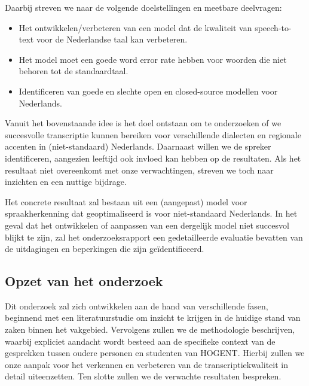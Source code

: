 Daarbij streven we naar de volgende doelstellingen en meetbare deelvragen:
\begin{itemize}
    \item Het ontwikkelen/verbeteren van een model dat de kwaliteit van speech-to-text voor de Nederlandse taal kan verbeteren.
    \item Het model moet een goede word error rate hebben voor woorden die niet behoren tot de standaardtaal.
    \item Identificeren van goede en slechte open en closed-source modellen voor Nederlands.
\end{itemize}

Vanuit het bovenstaande idee is het doel ontstaan om te onderzoeken of we succesvolle transcriptie kunnen bereiken voor verschillende dialecten en regionale accenten in (niet-standaard) Nederlands. Daarnaast willen we de spreker identificeren, aangezien leeftijd ook invloed kan hebben op de resultaten. Als het resultaat niet overeenkomt met onze verwachtingen, streven we toch naar inzichten en een nuttige bijdrage.

Het concrete resultaat zal bestaan uit een (aangepast) model voor spraakherkenning dat geoptimaliseerd is voor niet-standaard Nederlands. In het geval dat het ontwikkelen of aanpassen van een dergelijk model niet succesvol blijkt te zijn, zal het onderzoeksrapport een gedetailleerde evaluatie bevatten van de uitdagingen en beperkingen die zijn geïdentificeerd.

\subsection{Opzet van het onderzoek}
Dit onderzoek zal zich ontwikkelen aan de hand van verschillende fasen, beginnend met een literatuurstudie om inzicht te krijgen in de huidige stand van zaken binnen het vakgebied. Vervolgens zullen we de methodologie beschrijven, waarbij expliciet aandacht wordt besteed aan de specifieke context van de gesprekken tussen oudere personen en studenten van HOGENT. Hierbij zullen we onze aanpak voor het verkennen en verbeteren van de transcriptiekwaliteit in detail uiteenzetten. Ten slotte zullen we de verwachte resultaten bespreken.

